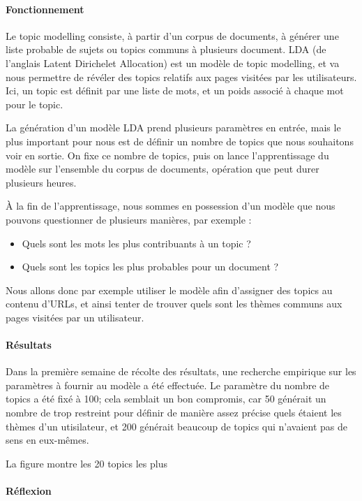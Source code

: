 			\paragraph{Fonctionnement}

				Le topic modelling consiste, à partir d'un corpus de documents, à générer une liste probable de sujets ou topics communs à plusieurs document. LDA (de l'anglais Latent Dirichelet Allocation) est un modèle de topic modelling, et va nous permettre de révéler des topics relatifs aux pages visitées par les utilisateurs. Ici, un topic est définit par une liste de mots, et un poids associé à chaque mot pour le topic.

				La génération d'un modèle LDA prend plusieurs paramètres en entrée, mais le plus important pour nous est de définir un nombre de topics que nous souhaitons voir en sortie. On fixe ce nombre de topics, puis on lance l'apprentissage du modèle sur l'ensemble du corpus de documents, opération que peut durer plusieurs heures.

				À la fin de l'apprentissage, nous sommes en possession d'un modèle que nous pouvons questionner de plusieurs manières, par exemple :
				\begin{itemize}
					\item Quels sont les mots les plus contribuants à un topic ?
					\item Quels sont les topics les plus probables pour un document ?
				\end{itemize}

				Nous allons donc par exemple utiliser le modèle afin d'assigner des topics au contenu d'URLs, et ainsi tenter de trouver quels sont les thèmes communs aux pages visitées par un utilisateur.

			\paragraph{Résultats}

				Dans la première semaine de récolte des résultats, une recherche empirique sur les paramètres à fournir au modèle a été effectuée. Le paramètre du nombre de topics a été fixé à 100; cela semblait un bon compromis, car 50 générait un nombre de trop restreint pour définir de manière assez précise quels étaient les thèmes d'un utisilateur, et 200 générait beaucoup de topics qui n'avaient pas de sens en eux-mêmes.

				La figure montre les 20 topics les plus 

			\paragraph{Réflexion}

